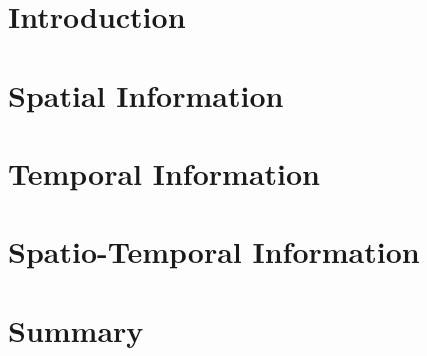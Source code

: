 \section*{Introduction}

\section{Spatial Information}

\section{Temporal Information}

\section{Spatio-Temporal Information}

\section*{Summary}